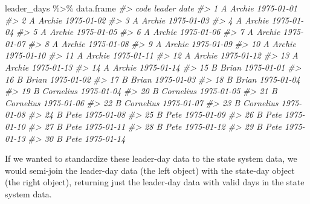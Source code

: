 \documentclass[
  11pt,
]{article}
\newenvironment{Shaded}{\begin{snugshade}}{\end{snugshade}}
\newcommand{\CommentTok}[1]{\textcolor[rgb]{0.56,0.35,0.01}{\textit{#1}}}
\newcommand{\NormalTok}[1]{#1}
\newcommand{\SpecialCharTok}[1]{\textcolor[rgb]{0.00,0.00,0.00}{#1}}
\begin{document}
\begin{Shaded}
\begin{Highlighting}[]
\NormalTok{leader\_days }\SpecialCharTok{\%\textgreater{}\%}\NormalTok{ data.frame}
\CommentTok{\#\textgreater{}    code    leader       date}
\CommentTok{\#\textgreater{} 1     A    Archie 1975{-}01{-}01}
\CommentTok{\#\textgreater{} 2     A    Archie 1975{-}01{-}02}
\CommentTok{\#\textgreater{} 3     A    Archie 1975{-}01{-}03}
\CommentTok{\#\textgreater{} 4     A    Archie 1975{-}01{-}04}
\CommentTok{\#\textgreater{} 5     A    Archie 1975{-}01{-}05}
\CommentTok{\#\textgreater{} 6     A    Archie 1975{-}01{-}06}
\CommentTok{\#\textgreater{} 7     A    Archie 1975{-}01{-}07}
\CommentTok{\#\textgreater{} 8     A    Archie 1975{-}01{-}08}
\CommentTok{\#\textgreater{} 9     A    Archie 1975{-}01{-}09}
\CommentTok{\#\textgreater{} 10    A    Archie 1975{-}01{-}10}
\CommentTok{\#\textgreater{} 11    A    Archie 1975{-}01{-}11}
\CommentTok{\#\textgreater{} 12    A    Archie 1975{-}01{-}12}
\CommentTok{\#\textgreater{} 13    A    Archie 1975{-}01{-}13}
\CommentTok{\#\textgreater{} 14    A    Archie 1975{-}01{-}14}
\CommentTok{\#\textgreater{} 15    B     Brian 1975{-}01{-}01}
\CommentTok{\#\textgreater{} 16    B     Brian 1975{-}01{-}02}
\CommentTok{\#\textgreater{} 17    B     Brian 1975{-}01{-}03}
\CommentTok{\#\textgreater{} 18    B     Brian 1975{-}01{-}04}
\CommentTok{\#\textgreater{} 19    B Cornelius 1975{-}01{-}04}
\CommentTok{\#\textgreater{} 20    B Cornelius 1975{-}01{-}05}
\CommentTok{\#\textgreater{} 21    B Cornelius 1975{-}01{-}06}
\CommentTok{\#\textgreater{} 22    B Cornelius 1975{-}01{-}07}
\CommentTok{\#\textgreater{} 23    B Cornelius 1975{-}01{-}08}
\CommentTok{\#\textgreater{} 24    B      Pete 1975{-}01{-}08}
\CommentTok{\#\textgreater{} 25    B      Pete 1975{-}01{-}09}
\CommentTok{\#\textgreater{} 26    B      Pete 1975{-}01{-}10}
\CommentTok{\#\textgreater{} 27    B      Pete 1975{-}01{-}11}
\CommentTok{\#\textgreater{} 28    B      Pete 1975{-}01{-}12}
\CommentTok{\#\textgreater{} 29    B      Pete 1975{-}01{-}13}
\CommentTok{\#\textgreater{} 30    B      Pete 1975{-}01{-}14}
\end{Highlighting}
\end{Shaded}

If we wanted to standardize these leader-day data to the state system data, we would semi-join the leader-day data (the left object) with the state-day object (the right object), returning just the leader-day data with valid days in the state system data.
\end{document}
